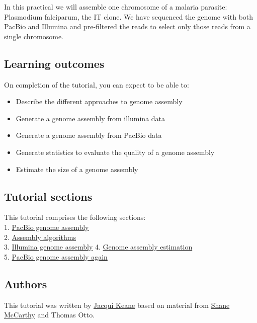 \documentclass[11pt]{article}
\providecommand{\tightlist}{%
      \setlength{\itemsep}{0pt}\setlength{\parskip}{0pt}}
\begin{document}
In this practical we will assemble one chromosome of a malaria parasite:
Plasmodium falciparum, the IT clone. We have sequenced the genome with
both PacBio and Illumina and pre-filtered the reads to select only those
reads from a single chromosome.

\hypertarget{learning-outcomes}{%
\subsection{Learning outcomes}\label{learning-outcomes}}

On completion of the tutorial, you can expect to be able to:

\begin{itemize}
\tightlist
\item
  Describe the different approaches to genome assembly
\item
  Generate a genome assembly from illumina data
\item
  Generate a genome assembly from PacBio data
\item
  Generate statistics to evaluate the quality of a genome assembly
\item
  Estimate the size of a genome assembly
\end{itemize}

\hypertarget{tutorial-sections}{%
\subsection{Tutorial sections}\label{tutorial-sections}}

This tutorial comprises the following sections:\\
1. \href{pacbio_assembly.ipynb}{PacBio genome assembly}\\
2. \href{assembly_algorithms.ipynb}{Assembly algorithms}\\
3. \href{illumina_assembly.ipynb}{Illumina genome assembly} 4.
\href{assembly_estimation.ipynb}{Genome assembly estimation}\\
5. \href{pacbio_assembly_again.ipynb}{PacBio genome assembly again}

\hypertarget{authors}{%
\subsection{Authors}\label{authors}}

This tutorial was written by
\href{https://github.com/jacquikeane}{Jacqui Keane} based on material
from \href{https://github.com/mcshane}{Shane McCarthy} and Thomas Otto.
\end{document}
